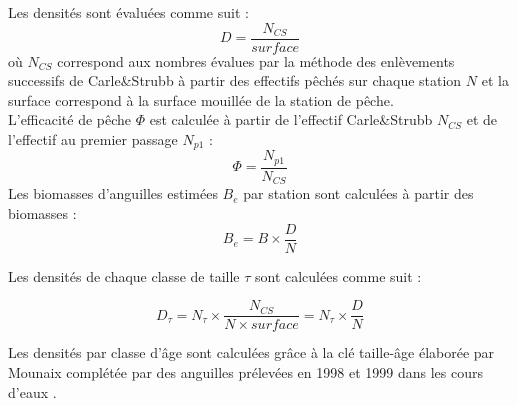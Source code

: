 \documentclass[10pt,twocolumn,titlepage,twoside]{article}\usepackage[]{graphicx}\usepackage[]{color}
\begin{document}
Les densités sont évaluées comme suit :
\begin{equation*}
D=\frac{N_{CS}}{surface}
\end{equation*}
où $N_{CS}$ correspond aux nombres évalues par la
méthode des enlèvements successifs de Carle\&Strubb
\citep{ogle_fsa_2013,carle_new_1978} à partir des effectifs pêchés sur chaque 
station $N$ et la surface correspond à la surface mouillée de la
station de pêche.\\
L'efficacité de pêche $\Phi$ est calculée à partir de l'effectif
Carle\&Strubb $N_{CS}$ et de l'effectif au premier passage
$N_{p1}$ :
\begin{equation*}
\Phi=\frac{N_{p1}}{N_{CS}}
\end{equation*}
Les biomasses d'anguilles estimées
$B_e$
par station sont calculées à partir des biomasses :
\begin{equation*}
B_e=B\times \frac{D}{N}
\end{equation*}

Les densités de chaque classe de taille $\tau$ sont calculées comme
suit :

\begin{equation*}
 D_{\tau}=N_{\tau} \times \frac{N_{CS}}{N \times surface}= N_{\tau} \times \frac{D}{N}
\end{equation*}


Les densités par classe d'âge sont calculées grâce à la clé
taille-âge élaborée par Mounaix \citep{mounaix_intercalibration_1992} complétée par
des anguilles prélevées en 1998 et 1999 dans les cours
d'eaux \citep{briand_effect_2006}.
\end{document}
